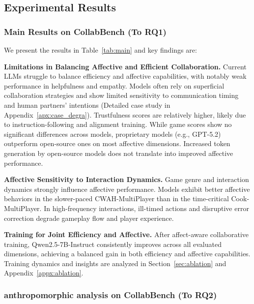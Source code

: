 \documentclass{article}
\theoremstyle{plain}
\theoremstyle{definition}
\theoremstyle{remark}
\begin{document}
\subsection{Experimental Results}








\subsubsection{Main Results on CollabBench (To RQ1)}

We present the results in Table~\ref{tab:main} and key findings are:





\textbf{Limitations in Balancing Affective and Efficient Collaboration.} Current LLMs struggle to balance efficiency and affective capabilities, with notably weak performance in helpfulness and empathy. Models often rely on superficial collaboration strategies and show limited sensitivity to communication timing and human partners’ intentions (Detailed case study in Appendix~\ref{apx:case_degra}). Trustfulness scores are relatively higher, likely due to instruction-following and alignment training. While game scores show no significant differences across models, proprietary models (e.g., GPT-5.2) outperform open-source ones on most affective dimensions. Increased token generation by open-source models does not translate into improved affective performance.


\textbf{Affective Sensitivity to Interaction Dynamics.} Game genre and interaction dynamics strongly influence affective performance. Models exhibit better affective behaviors in the slower-paced CWAH-MultiPlayer than in the time-critical Cook-MultiPlayer. In high-frequency interactions, ill-timed actions and disruptive error correction degrade gameplay flow and player experience.



\textbf{Training for Joint Efficiency and Affective.} After affect-aware collaborative training, Qwen2.5-7B-Instruct consistently improves across all evaluated dimensions, achieving a balanced gain in both efficiency and affective capabilities. Training dynamics and insights are analyzed in Section~\ref{sec:ablation} and Appendix~\ref{appx:ablation}.





\subsubsection{anthropomorphic analysis on CollabBench (To RQ2)}\label{sec:anthropomorphic}
\end{document}
